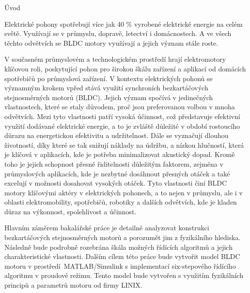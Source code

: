 
\chap Úvod



Elektrické pohony spotřebují více jak 40 \% vyrobené elektrické energie na celém světě. Využívají se 
v průmyslu, dopravě, letectví i domácnostech. A ve všech těchto odvětvích se BLDC motory využívají a 
jejich význam stále roste.  

V současném průmyslovém a technologickém prostředí hrají elektromotory klíčovou roli, poskytující pohon pro širokou 
škálu zařízení a aplikací od domácích spotřebičů po průmyslová zařízení. V kontextu elektrických pohonů se významným krokem 
vpřed stává využití synchroních bezkartáčových stejnosměrných motorů (BLDC). Jejich význam spočívá 
v jedinečných vlastnostech, které se staly důvodem, proč jsou preferovanou volbou v mnoha odvětvích. 
Mezi tyto vlastnosti patří vysoká účinnost, což představuje efektivní využití dodávané elektrické energie, a to je zvláště 
důležité v období rostoucího důrazu na energetickou efektivitu a udržitelnost. Dále se vyznačují dlouhou životností, díky které se
 tak snižují náklady na údržbu, a nízkou hlučností, která je klíčová v aplikacích, kde je potřeba minimalizovat akustický dopad. 
Kromě toho je jejich schopnost přesné řiditelnosti důležitým faktorem, zejména v průmyslových aplikacích, kde je nezbytné 
dosáhnout přesných otáček a také excelují v možnosti dosahovat vysokých otáček. Tyto vlastnosti činí BLDC motory klíčovými aktéry v elektrických pohonech, a to 
nejen v průmyslu, ale i v oblasti elektromobility, spotřebičů, robotiky a dalších odvětvích, kde je kladen důraz na 
výkonnost, spolehlivost a účinnost.

Hlavním záměrem bakalářské práce je detailně analyzovat konstrukci bezkartáčových stejnosměrných motorů a porozumět 
jim z fyzikálního hlediska. Následně bude podrobně rozebrána škála možných řídících algoritmů a jejich charakteristické
vlastnosti. Dalším cílem této práce bude vytvořit model BLDC motoru v prostředí~\nobreak{}MATLAB/Simulink s implementací \nobreak{}six-stepového
řídícího algoritmu v proudové režimu. Tento model bude vytvořen s využitím fyzikálních principů a parametrů motoru od 
firmy LINIX.

